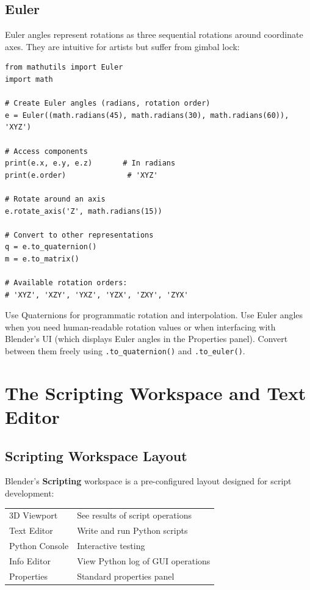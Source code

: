 \subsection{Euler}

Euler angles represent rotations as three sequential rotations around coordinate axes. They are intuitive for artists but suffer from gimbal lock:

\begin{lstlisting}
from mathutils import Euler
import math

# Create Euler angles (radians, rotation order)
e = Euler((math.radians(45), math.radians(30), math.radians(60)), 'XYZ')

# Access components
print(e.x, e.y, e.z)       # In radians
print(e.order)              # 'XYZ'

# Rotate around an axis
e.rotate_axis('Z', math.radians(15))

# Convert to other representations
q = e.to_quaternion()
m = e.to_matrix()

# Available rotation orders:
# 'XYZ', 'XZY', 'YXZ', 'YZX', 'ZXY', 'ZYX'
\end{lstlisting}

\begin{tipbox}
Use Quaternions for programmatic rotation and interpolation. Use Euler angles when you need human-readable rotation values or when interfacing with Blender's UI (which displays Euler angles in the Properties panel). Convert between them freely using \texttt{.to\_quaternion()} and \texttt{.to\_euler()}.
\end{tipbox}


\section{The Scripting Workspace and Text Editor}
\label{sec:scripting-workspace}

\subsection{Scripting Workspace Layout}

Blender's \textbf{Scripting} workspace is a pre-configured layout designed for script development:

\begin{center}
\begin{tabularx}{\textwidth}{L{3.5cm}X}
\toprule
{}
 &  \\
\midrule
3D Viewport & See results of script operations \\
Text Editor & Write and run Python scripts \\
Python Console & Interactive testing \\
Info Editor & View Python log of GUI operations \\
Properties & Standard properties panel \\
\bottomrule
\end{tabularx}
\end{center}

